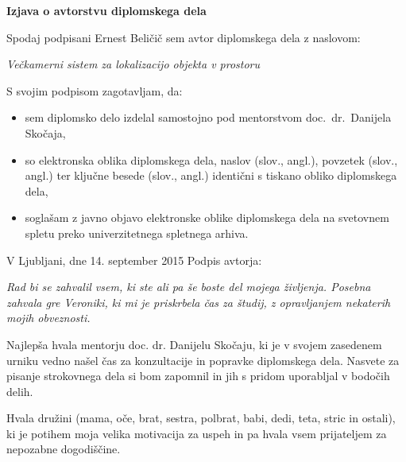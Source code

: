 \documentclass[a4paper, 12pt]{book}
\newcommand{\clearemptydoublepage}{\newpage{\pagestyle{empty}\cleardoublepage}}
\begin{document}
\vspace{2cm}

\clearemptydoublepage

\vspace*{1cm}
\begin{center}
{\Large \textbf{\sc Izjava o avtorstvu diplomskega dela}}
\end{center}

\vspace{1cm}
\noindent Spodaj podpisani Ernest Beličič sem avtor  diplomskega dela z naslovom:

\vspace{0.5cm}
\emph{Večkamerni sistem za lokalizacijo objekta v prostoru}

\vspace{1.5cm}
\noindent S svojim podpisom zagotavljam, da:
\begin{itemize}
	\item sem diplomsko delo izdelal samostojno pod mentorstvom
		doc.\ dr.\ Danijela Skočaja,

	\item	so elektronska oblika diplomskega dela, naslov (slov., angl.), povzetek (slov., angl.) ter ključne besede (slov., angl.) identični s tiskano obliko diplomskega dela,
	\item soglašam z javno objavo elektronske oblike diplomskega dela na svetovnem spletu preko univerzitetnega spletnega arhiva.	
\end{itemize}

\vspace{1cm}
\noindent V Ljubljani, dne 14. september 2015 \hfill Podpis avtorja:

\clearemptydoublepage

\thispagestyle{empty}\mbox{}\vfill\null\it%
Rad bi se zahvalil vsem, ki ste ali pa še boste del mojega življenja. Posebna zahvala gre Veroniki, ki mi je priskrbela čas za študij, z opravljanjem nekaterih mojih obveznosti. 

Najlepša hvala mentorju doc. dr. Danijelu Skočaju, ki je v svojem zasedenem urniku vedno našel čas za konzultacije in popravke diplomskega dela. Nasvete za pisanje strokovnega dela si bom zapomnil in jih s pridom uporabljal v bodočih delih.

Hvala družini (mama, oče, brat, sestra, polbrat, babi, dedi, teta, stric in ostali), ki je potihem moja velika motivacija za uspeh in pa hvala vsem prijateljem za nepozabne dogodiščine.
\end{document}
